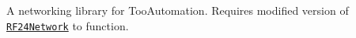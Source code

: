 A networking library for Too\+Automation. Requires modified version of \href{https://github.com/Avamander/RF24Network}{\tt R\+F24\+Network} to function. 